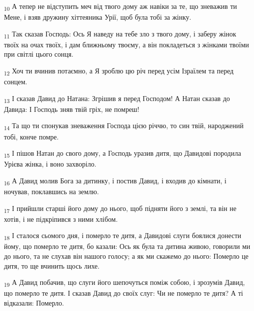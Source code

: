 \begin{tcolorbox}
\textsubscript{10} А тепер не відступить меч від твого дому аж навіки за те, що зневажив ти Мене, і взяв дружину хіттеяника Урії, щоб була тобі за жінку.
\end{tcolorbox}
\begin{tcolorbox}
\textsubscript{11} Так сказав Господь: Ось Я наведу на тебе зло з твого дому, і заберу жінок твоїх на очах твоїх, і дам ближньому твоєму, а він покладеться з жінками твоїми при світлі цього сонця.
\end{tcolorbox}
\begin{tcolorbox}
\textsubscript{12} Хоч ти вчинив потаємно, а Я зроблю цю річ перед усім Ізраїлем та перед сонцем.
\end{tcolorbox}
\begin{tcolorbox}
\textsubscript{13} І сказав Давид до Натана: Згрішив я перед Господом! А Натан сказав до Давида: І Господь зняв твій гріх, не помреш!
\end{tcolorbox}
\begin{tcolorbox}
\textsubscript{14} Та що ти спонукав зневаження Господа цією річчю, то син твій, народжений тобі, конче помре.
\end{tcolorbox}
\begin{tcolorbox}
\textsubscript{15} І пішов Натан до свого дому, а Господь уразив дитя, що Давидові породила Урієва жінка, і воно захворіло.
\end{tcolorbox}
\begin{tcolorbox}
\textsubscript{16} А Давид молив Бога за дитинку, і постив Давид, і входив до кімнати, і ночував, поклавшись на землю.
\end{tcolorbox}
\begin{tcolorbox}
\textsubscript{17} І прийшли старші його дому до нього, щоб підняти його з землі, та він не хотів, і не підкріпився з ними хлібом.
\end{tcolorbox}
\begin{tcolorbox}
\textsubscript{18} І сталося сьомого дня, і померло те дитя, а Давидові слуги боялися донести йому, що померло те дитя, бо казали: Ось як була та дитина живою, говорили ми до нього, та не слухав він нашого голосу; а як ми скажемо до нього: Померло це дитя, то ще вчинить щось лихе.
\end{tcolorbox}
\begin{tcolorbox}
\textsubscript{19} А Давид побачив, що слуги його шепочуться поміж собою, і зрозумів Давид, що померло те дитя. І сказав Давид до своїх слуг: Чи не померло те дитя? А ті відказали: Померло.
\end{tcolorbox}
